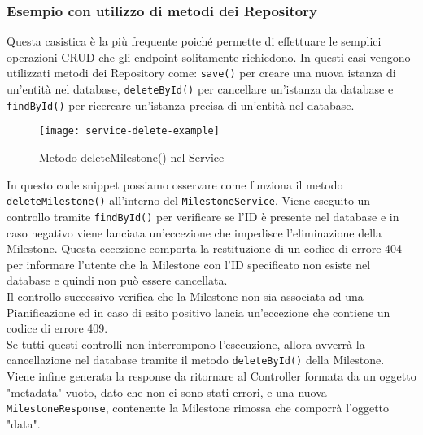 \subsubsection{Esempio con utilizzo di metodi dei Repository}
Questa casistica è la più frequente poiché permette di effettuare le semplici operazioni CRUD che gli endpoint solitamente richiedono. In questi casi vengono utilizzati metodi dei Repository come: \texttt{save()} per creare una nuova istanza di un'entità nel database, \texttt{deleteById()} per cancellare un'istanza da database e \texttt{findById()} per ricercare un'istanza precisa di un'entità nel database.
\begin{figure}[H] 
    \centering 
    \texttt{[image: service-delete-example]} 
    \caption{Metodo deleteMilestone() nel Service}
\end{figure}
\noindent In questo code snippet possiamo osservare come funziona il metodo \texttt{deleteMilestone()} all'interno del \texttt{MilestoneService}. Viene eseguito un controllo tramite \texttt{findById()} per verificare se l'ID è presente nel database e in caso negativo viene lanciata un'eccezione che impedisce l'eliminazione della Milestone. Questa eccezione comporta la restituzione di un codice di errore 404 per informare l'utente che la Milestone con l'ID specificato non esiste nel database e quindi non può essere cancellata.\\
Il controllo successivo verifica che la Milestone non sia associata ad una Pianificazione ed in caso di esito positivo lancia un'eccezione che contiene un codice di errore 409.\\
Se tutti questi controlli non interrompono l'esecuzione, allora avverrà la cancellazione nel database tramite il metodo \texttt{deleteById()} della Milestone.\\
Viene infine generata la response da ritornare al Controller formata da un oggetto "metadata" vuoto, dato che non ci sono stati errori, e una nuova \texttt{MilestoneResponse}, contenente la Milestone rimossa che comporrà l'oggetto "data".

